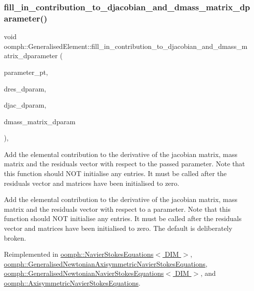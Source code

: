 \subsubsection{\texorpdfstring{fill\+\_\+in\+\_\+contribution\+\_\+to\+\_\+djacobian\+\_\+and\+\_\+dmass\+\_\+matrix\+\_\+dparameter()}{fill\_in\_contribution\_to\_djacobian\_and\_dmass\_matrix\_dparameter()}}
{\footnotesize\ttfamily void oomph\+::\+Generalised\+Element\+::fill\+\_\+in\+\_\+contribution\+\_\+to\+\_\+djacobian\+\_\+and\+\_\+dmass\+\_\+matrix\+\_\+dparameter (\begin{DoxyParamCaption}\item[{double $\ast$const \&}]{parameter\+\_\+pt,  }\item[{\hyperlink{classoomph_1_1Vector}{Vector}$<$ double $>$ \&}]{dres\+\_\+dparam,  }\item[{\hyperlink{classoomph_1_1DenseMatrix}{Dense\+Matrix}$<$ double $>$ \&}]{djac\+\_\+dparam,  }\item[{\hyperlink{classoomph_1_1DenseMatrix}{Dense\+Matrix}$<$ double $>$ \&}]{dmass\+\_\+matrix\+\_\+dparam }\end{DoxyParamCaption})\hspace{0.3cm}{\ttfamily [protected]}, {\ttfamily [virtual]}}



Add the elemental contribution to the derivative of the jacobian matrix, mass matrix and the residuals vector with respect to the passed parameter. Note that this function should N\+OT initialise any entries. It must be called after the residuals vector and matrices have been initialised to zero. 

Add the elemental contribution to the derivative of the jacobian matrix, mass matrix and the residuals vector with respect to a parameter. Note that this function should N\+OT initialise any entries. It must be called after the residuals vector and matrices have been initialised to zero. The default is deliberately broken. 

Reimplemented in \hyperlink{classoomph_1_1NavierStokesEquations_afc1a9658058fb9183b89e5d3a4dabee0}{oomph\+::\+Navier\+Stokes\+Equations$<$ D\+I\+M $>$}, \hyperlink{classoomph_1_1GeneralisedNewtonianAxisymmetricNavierStokesEquations_a1456ce3e18f58d639fb29fb51f5f6a68}{oomph\+::\+Generalised\+Newtonian\+Axisymmetric\+Navier\+Stokes\+Equations}, \hyperlink{classoomph_1_1GeneralisedNewtonianNavierStokesEquations_a9db1ab85593b9eb02744bad781f64204}{oomph\+::\+Generalised\+Newtonian\+Navier\+Stokes\+Equations$<$ D\+I\+M $>$}, and \hyperlink{classoomph_1_1AxisymmetricNavierStokesEquations_aa52f3f082e2dc8b2c0bc99215dc3ce02}{oomph\+::\+Axisymmetric\+Navier\+Stokes\+Equations}.



